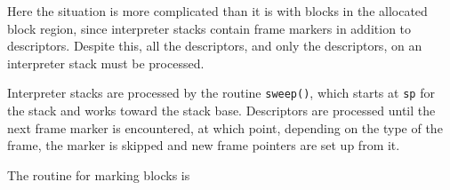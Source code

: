 Here the situation is more complicated than it is with blocks in the
allocated block region, since interpreter stacks contain frame markers
in addition to descriptors. Despite this, all the descriptors, and
only the descriptors, on an interpreter stack must be processed.

Interpreter stacks are processed by the routine \texttt{sweep()},
which starts at \texttt{sp} for the stack and works toward the stack
base. Descriptors are processed until the next frame marker is
encountered, at which point, depending on the type of the frame, the
marker is skipped and new frame pointers are set up from it.

The routine for marking blocks is

